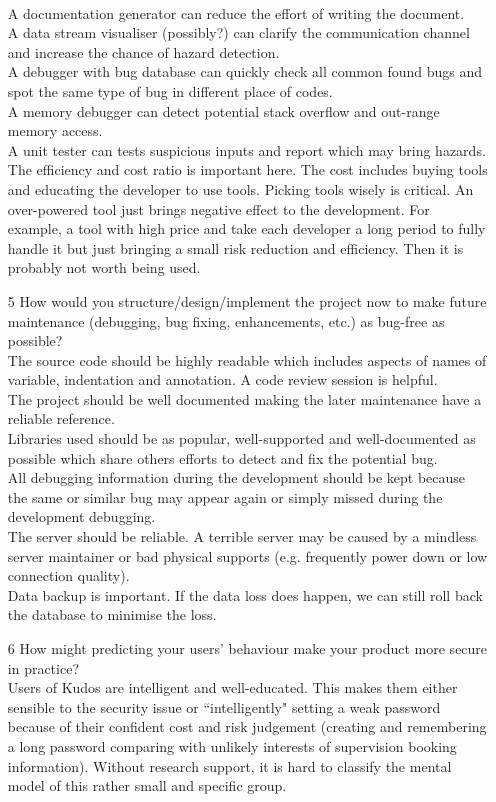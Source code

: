 \documentclass[10pt,twoside,a4paper]{article}
\begin{document}
\begin{itemize}
\\A documentation generator can reduce the effort of writing the document.
\\A data stream visualiser (possibly?) can clarify the communication channel and increase the chance of hazard detection.
\\A debugger with bug database can quickly check all common found bugs and spot the same type of bug in different place of codes.
\\A memory debugger can detect potential stack overflow and out-range memory access.
\\A unit tester can tests suspicious inputs and report which may bring hazards.
\\The efficiency and cost ratio is important here. The cost includes buying tools and educating the developer to use tools. Picking tools wisely is critical. An over-powered tool just brings negative effect to the development. For example, a tool with high price and take each developer a long period to fully handle it but just bringing a small risk reduction and efficiency. Then it is probably not worth being used.
\item[5] How would you structure/design/implement the project now to make future maintenance (debugging, bug fixing, enhancements, etc.) as bug-free as possible? 
\\The source code should be highly readable which includes aspects of names of variable, indentation and annotation. A code review session is helpful.
\\The project should be well documented making the later maintenance have a reliable reference.
\\Libraries used should be as popular, well-supported and well-documented as possible which share others efforts to detect and fix the potential bug.
\\All debugging information during the development should be kept because the same or similar bug may appear again or simply missed during the development debugging.
\\The server should be reliable. A terrible server may be caused by a mindless server maintainer or bad physical supports (e.g. frequently power down or low connection quality).
\\Data backup is important. If the data loss does happen, we can still roll back the database to minimise the loss.
\item[6] How might predicting your users' behaviour make your product more secure in practice?
\\Users of Kudos are intelligent and well-educated. This makes them either sensible to the security issue or ``intelligently" setting a weak password because of their confident cost and risk judgement (creating and remembering a long password comparing with unlikely interests of supervision booking information). Without research support, it is hard to classify the mental model of this rather small and specific group.

\end{itemize}
\end{document}
